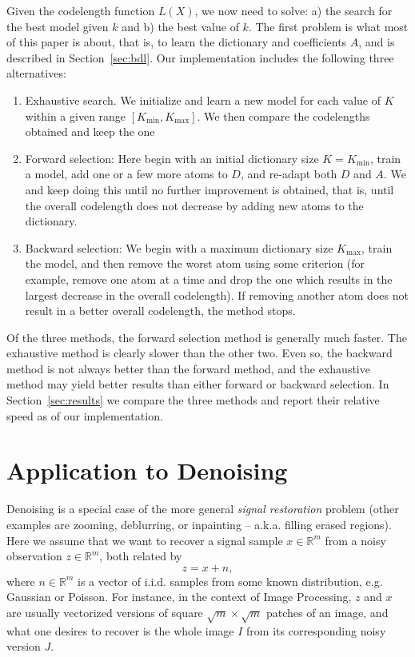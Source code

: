 \documentclass[twocolumn]{IEEEtran}
\theoremstyle{definition}
\def\reals{\ensuremath{\mathbb{R}}}
\begin{document}
Given the codelength function $L(X)$, we now need to solve: a) the search for the best model given $k$ and b) the best value of $k$. The first problem is what most of this paper is about, that is, to learn the dictionary and coefficients $A$, and is described in Section~\ref{sec:bdl}. Our implementation includes the following three alternatives:
\begin{enumerate}

\item Exhaustive search. We initialize and learn a new model for each value of $K$ within a given range $[K_{\min}, K_{\max}]$. We then compare the codelengths obtained and keep the one 

\item Forward selection: Here begin with an initial dictionary size $K=K_{\min}$, train a model, add one or a few more atoms to $D$, and re-adapt both $D$ and $A$. We and keep doing this until no further improvement is obtained, that is, until the overall codelength does not decrease by adding new atoms to the dictionary.
 
\item Backward selection: We begin with a maximum dictionary size $K_{\max}$, train the model, and then remove the worst atom using some criterion (for example, remove one atom at a time and drop the one  which results in the largest decrease in the overall codelength). If removing another atom does not result in a better overall codelength, the method stops. 
\end{enumerate}

Of the three methods, the forward selection  method is generally much faster. The exhaustive method is clearly slower than the other two. Even so, the backward method is not always better than the forward method, and the exhaustive method may yield better results than either forward or backward selection. In Section~\ref{sec:results} we compare the three methods and report their relative speed as of our implementation.

\section{Application to Denoising}
\label{sec:denoising}

Denoising is a special case of the more general \emph{signal restoration} problem (other examples are zooming, deblurring, or inpainting -- a.k.a. filling erased regions). Here we assume that we want to recover a signal sample $x \in \reals^{m}$ from a noisy observation $z \in \reals^{m}$, both related by
\[
z = x + n,
\]
where $n \in \reals^m$ is a vector of i.i.d. samples from some known distribution, e.g. Gaussian or Poisson. For instance, in the context of Image Processing, $z$ and $x$ are usually vectorized versions of square $\sqrt{m}\times\sqrt{m}$ patches of an image, and what one desires to recover is the whole image $I$ from its corresponding noisy version $J$.
\end{document}
